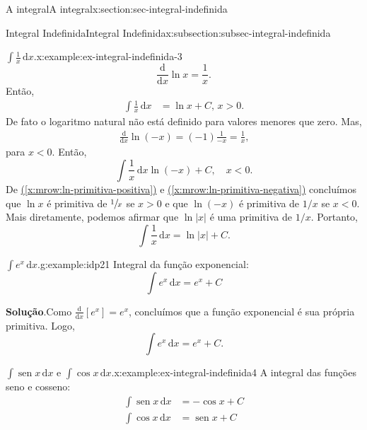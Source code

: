 \documentclass[oneside,10pt,]{article}
\newcommand{\blocktitlefont}{\relax}
\newcommand{\xreffont}{\relax}
\numberwithin{equation}{section}
\newcommand{\dd}{\mathrm{d}}
\newcommand{\integral}[2]{\displaystyle\int {#1}\,\dd {#2}}
\DeclareMathOperator{\sin}{sen}
\newcommand{\lt}{<}
\newcommand{\gt}{>}
\newcommand{\amp}{&}
\begin{document}
\begin{sectionptx}{A integral}{}{A integral}{}{}{x:section:sec-integral-indefinida}
\begin{subsectionptx}{Integral Indefinida}{}{Integral Indefinida}{}{}{x:subsection:subsec-integral-indefinida}
\begin{example}{\(\integral{\frac{1}{x}}{x}\).}{x:example:ex-integral-indefinida-3}
\begin{equation*}
\frac{\dd}{\dd x}\ln{x}= \frac{1}{x}\text{.}
\end{equation*}
Então,%
\begin{align}
\integral{\frac{1}{x}}{x} \amp= \ln{x} + C, \, x \gt 0  \text{.}\tag{\(\star\)}\label{x:mrow:ln-primitiva-positiva}
\end{align}
De fato o logaritmo natural não está definido para valores menores que zero. Mas,%
\begin{gather}
\frac{\dd}{\dd x}\ln{(-x)} = (-1)\frac{1}{-x}=\frac{1}{x}  \text{,}\tag{\(\star\star\)}\label{x:mrow:ln-primitiva-negativa}
\end{gather}
para \(x \lt 0\). Então,%
\begin{equation*}
\integral{\frac{1}{x}}{x}  \ln{(-x)} + C, \quad x \lt 0 \text{.}
\end{equation*}
De \hyperref[x:mrow:ln-primitiva-positiva]{({\xreffont\ref{x:mrow:ln-primitiva-positiva}})} e \hyperref[x:mrow:ln-primitiva-negativa]{({\xreffont\ref{x:mrow:ln-primitiva-negativa}})} concluímos que \(\ln{x}\) é primitiva de  \(\sfrac{1}{x}\) se \(x\gt 0\) e que  \(\ln{(-x)}\) é primitiva de \(1/x\) se \(x\lt 0\). Mais diretamente, podemos afirmar que \(\ln{|x|}\) é uma primitiva de \(1/x\). Portanto,%
\begin{equation*}
\integral{\frac{1}{x}}{x} = \ln{|x|} + C\text{.}
\end{equation*}
%
\end{example}
\begin{example}{\(\integral{e^x}{x}\).}{g:example:idp21}%
Integral da função exponencial:%
\begin{equation*}
\integral{e^x}{x}=e^x + C 
\end{equation*}
%
\par\smallskip%
\noindent\textbf{\blocktitlefont Solução}.\hypertarget{g:solution:idp22}{}\quad{}Como \(\frac{\dd }{\dd x}[e^x]=e^x\), concluímos que a função exponencial é sua própria primitiva. Logo,%
\begin{equation*}
\integral{e^x}{x}= e^x + C.
\end{equation*}
%
\end{example}
\begin{example}{\(\integral{\sin{x}}{x}\) e \(\integral{\cos{x}}{x}\).}{x:example:ex-integral-indefinida4}%
A integral das funções seno e cosseno:%
\begin{align*}
\integral{\sin{x}}{x}\amp =-\cos{x}+C\\
\integral{\cos{x}}{x} \amp=\sin{x}+C 

\end{align*}
\end{example}
\end{subsectionptx}
\end{sectionptx}
\end{document}
